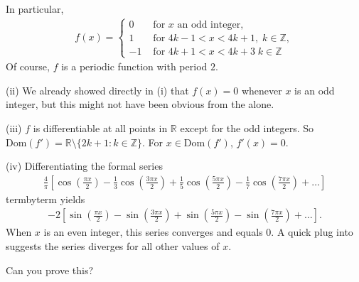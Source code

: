 \documentclass[letterpaper,10pt,english]{jupyterBook}
\begin{document}
\sphinxAtStartPar
In particular,
\begin{equation*}
\begin{split}
f(x) = \left\{\begin{array}{cl} 0 & \text{ for } x \text{ an odd integer},\\
1 & \text{ for } 4k-1<x<4k+1, \; k\in\mathbb{Z}, \\
-1 & \text{ for } 4k+1<x<4k+3 \; k\in\mathbb{Z}  \end{array}\right.
\end{split}
\end{equation*}
\sphinxAtStartPar
Of course, \(f\) is a periodic function with period \(2\).

\sphinxAtStartPar
(ii) We already showed directly in (i) that \(f(x)=0\) whenever \(x\) is an odd integer, but this might not have been obvious from the  alone.

\sphinxAtStartPar
(iii) \(f\) is differentiable at all points in \(\mathbb{R}\) except for the odd integers. So \(\text{Dom}(f') = \mathbb{R}\setminus\{2k+1:k\in\mathbb{Z}\}\). For \(x\in\text{Dom}(f')\), \(f'(x)=0\).

\sphinxAtStartPar
(iv) Differentiating the formal series
\begin{equation*}
\begin{split}
\frac{4}{\pi}\left[\cos\left(\frac{\pi x}{2}\right)-\frac{1}{3}\cos\left(\frac{3\pi x}{2}\right)+\frac{1}{5}\cos\left(\frac{5\pi x}{2}\right)-\frac{1}{7}\cos\left(\frac{7\pi x}{2}\right)+\ldots\right]
\end{split}
\end{equation*}
\sphinxAtStartPar
term\sphinxhyphen{}by\sphinxhyphen{}term yields
\begin{equation*}
\begin{split}
-2\left[\sin\left(\frac{\pi x}{2}\right)-\sin\left(\frac{3\pi x}{2}\right)+\sin\left(\frac{5\pi x}{2}\right)-\sin\left(\frac{7\pi x}{2}\right)+\ldots\right].
\end{split}
\end{equation*}
\sphinxAtStartPar
When \(x\) is an even integer, this series converges and equals \(0\). A quick plug into  suggests the series diverges for all other values of \(x\).

\sphinxAtStartPar
{} Can you prove this?
\end{document}
